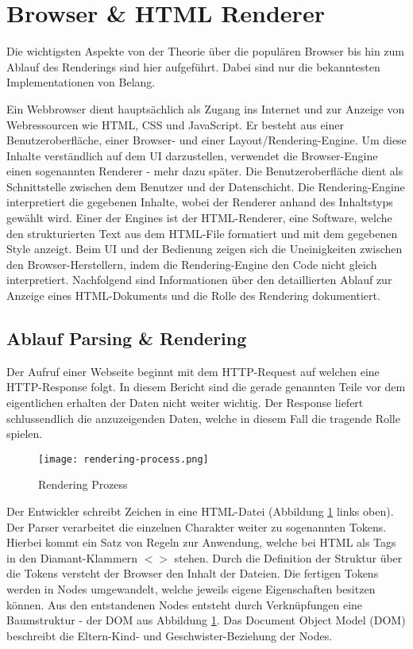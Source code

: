 \section{Browser \& HTML Renderer}
\label{sec:browserRenderer}

Die wichtigsten Aspekte von der Theorie über die populären Browser bis hin zum Ablauf des Renderings sind hier aufgeführt.
Dabei sind nur die bekanntesten Implementationen von Belang.

Ein Webbrowser dient hauptsächlich als Zugang ins Internet und zur Anzeige von Webressourcen wie HTML, CSS und JavaScript.
Er besteht aus einer Benutzeroberfläche, einer Browser- und einer Layout/Rendering-Engine.
Um diese Inhalte verständlich auf dem UI darzustellen, verwendet die Browser-Engine einen sogenannten Renderer - mehr dazu später.
Die Benutzeroberfläche dient als Schnittstelle zwischen dem Benutzer und der Datenschicht. 
Die Rendering-Engine interpretiert die gegebenen Inhalte, wobei der Renderer anhand des Inhaltstyps gewählt wird. 
Einer der Engines ist der HTML-Renderer, eine Software, welche den strukturierten Text aus dem HTML-File formatiert und mit dem gegebenen Style anzeigt.
Beim UI und der Bedienung zeigen sich die Uneinigkeiten zwischen den Browser-Herstellern, indem die Rendering-Engine den Code nicht gleich interpretiert.
Nachfolgend sind Informationen über den detaillierten Ablauf zur Anzeige eines HTML-Dokuments und die Rolle des Rendering dokumentiert.


\subsection{Ablauf Parsing \& Rendering}
\label{sec:parsingRendering}

Der Aufruf einer Webseite beginnt mit dem HTTP-Request auf welchen eine HTTP-Response folgt.
In diesem Bericht sind die gerade genannten Teile vor dem eigentlichen erhalten der Daten nicht weiter wichtig.
Der Response liefert schlussendlich die anzuzeigenden Daten, welche in diesem Fall die tragende Rolle spielen.

\begin{figure}[!htb]
    \centering
    \texttt{[image: rendering-process.png]}
    \caption{Rendering Prozess}
    \label{img:RenderingProcess}
\end{figure}

Der Entwickler schreibt Zeichen in eine HTML-Datei (Abbildung \ref{img:RenderingProcess} links oben).
Der Parser verarbeitet die einzelnen Charakter weiter zu sogenannten Tokens.
Hierbei kommt ein Satz von Regeln zur Anwendung, welche bei HTML als Tags in den Diamant-Klammern $<>$ stehen.
Durch die Definition der Struktur über die Tokens versteht der Browser den Inhalt der Dateien.
Die fertigen Tokens werden in Nodes umgewandelt, welche jeweils eigene Eigenschaften besitzen können.
Aus den entstandenen Nodes entsteht durch Verknüpfungen eine Baumstruktur - der DOM aus Abbildung \ref{img:RenderingProcess}.
Das Document Object Model (DOM) beschreibt die Eltern-Kind- und Geschwister-Beziehung der Nodes.

